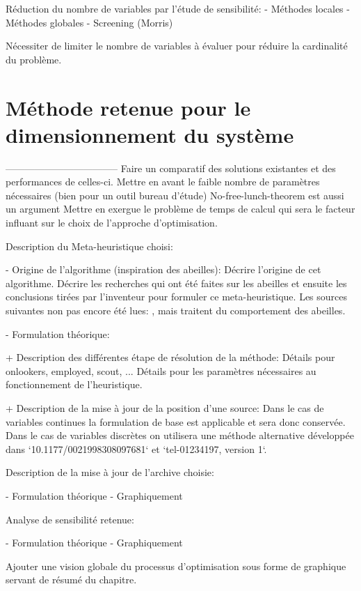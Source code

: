 Réduction du nombre de variables par l’étude de sensibilité:
 - Méthodes locales
 - Méthodes globales
 - Screening (Morris)

Nécessiter de limiter le nombre de variables à évaluer pour réduire la cardinalité
du problème.



\section{Méthode retenue pour le dimensionnement du système} %
\label{sec:methode_retenue_pour_le_dimensionnement_du_systeme}
-----------------------------------
Faire un comparatif des solutions existantes et des performances de celles-ci.
Mettre en avant le faible nombre de paramètres nécessaires (bien pour un outil bureau d’étude)
No-free-lunch-theorem est aussi un argument
Mettre en exergue le problème de temps de calcul qui sera le facteur influant
sur le choix de l’approche d’optimisation.

Description du Meta-heuristique choisi:

 - Origine de l’algorithme (inspiration des abeilles):
Décrire l’origine de cet algorithme. Décrire les recherches qui ont été faites sur
les abeilles et ensuite les conclusions tirées par l’inventeur pour formuler ce
meta-heuristique.
Les sources suivantes non pas encore été lues: \cite{Camazine_1991547}, \cite{Wisdom_of_the_Hive}
mais traitent du comportement des abeilles.

 - Formulation théorique:

    + Description des différentes étape de résolution de la méthode:
      Détails pour onlookers, employed, scout, ...
      Détails pour les paramètres nécessaires au fonctionnement de l’heuristique.

    + Description de la mise à jour de la position d’une source:
      Dans le cas de variables continues la formulation de base est applicable et sera
      donc conservée. Dans le cas de variables discrètes on utilisera une méthode alternative
      développée dans `10.1177/0021998308097681` et `tel-01234197, version 1`.

Description de la mise à jour de l’archive choisie:

 - Formulation théorique
 - Graphiquement

Analyse de sensibilité retenue:

 - Formulation théorique
 - Graphiquement

Ajouter une vision globale du processus d’optimisation sous forme de graphique
servant de résumé du chapitre.


